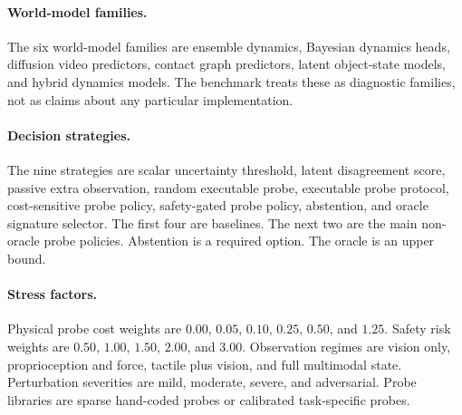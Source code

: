 \documentclass{article}
\begin{document}
\paragraph{World-model families.}
The six world-model families are ensemble dynamics, Bayesian dynamics heads, diffusion video predictors, contact graph predictors, latent object-state models, and hybrid dynamics models. The benchmark treats these as diagnostic families, not as claims about any particular implementation.

\paragraph{Decision strategies.}
The nine strategies are scalar uncertainty threshold, latent disagreement score, passive extra observation, random executable probe, executable probe protocol, cost-sensitive probe policy, safety-gated probe policy, abstention, and oracle signature selector. The first four are baselines. The next two are the main non-oracle probe policies. Abstention is a required option. The oracle is an upper bound.

\paragraph{Stress factors.}
Physical probe cost weights are $0.00$, $0.05$, $0.10$, $0.25$, $0.50$, and $1.25$. Safety risk weights are $0.50$, $1.00$, $1.50$, $2.00$, and $3.00$. Observation regimes are vision only, proprioception and force, tactile plus vision, and full multimodal state. Perturbation severities are mild, moderate, severe, and adversarial. Probe libraries are sparse hand-coded probes or calibrated task-specific probes.
\end{document}
